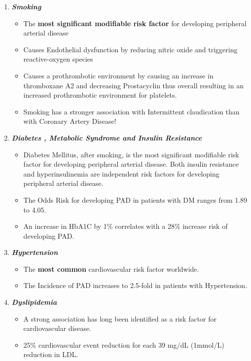 \documentclass[
]{book}
\begin{document}
\begin{enumerate}
\def\labelenumi{\arabic{enumi}.}
\item
  \textbf{\emph{Smoking}}

  \begin{itemize}
  \item
    The \textbf{most significant modifiable risk factor} for developing
    peripheral arterial disease
  \item
    Causes Endothelial dysfunction by reducing nitric oxide and
    triggering reactive-oxygen species
    \citep{unitedstatessurgeongeneralHealthConsequencesSmoking2014}
  \item
    Causes a prothrombotic environment by causing an increase in
    thromboxane A2 and decreasing Prostacyclin thus overall
    resulting in an increased prothrombotic environment for
    platelets.
  \item
    Smoking has a stronger association with Intermittent
    claudication than with Coronary Artery Disease!
    \citep{gordonPredispositionAtherosclerosisHead1972}
  \end{itemize}
\item
  \textbf{\emph{Diabetes , Metabolic Syndrome and Insulin Resistance}}

  \begin{itemize}
  \item
    Diabetes Mellitus, after smoking, is the most significant
    modifiable risk factor for developing peripheral arterial
    disease. Both insulin resistance and hyperinsulinemia are
    independent risk factors for developing peripheral arterial
    disease.
  \item
    The Odds Risk for developing PAD in patients with DM ranges from
    1.89 to 4.05.
  \item
    An increase in HbA1C by 1\% correlates with a 28\% increase risk
    of developing PAD. \citep{adlerUKPDS59Hyperglycemia2002}
  \end{itemize}
\item
  \textbf{\emph{Hypertension}}

  \begin{itemize}
  \item
    The \textbf{most common} cardiovascular risk factor worldwide.
  \item
    The Incidence of PAD increases to 2.5-fold in patients with
    Hypertension. \citep{kannelUpdateEpidemiologicFeatures1985}
  \end{itemize}
\item
  \textbf{\emph{Dyslipidemia}}

  \begin{itemize}
  \item
    A strong association has long been identified as a risk factor
    for cardiovascular disease.
  \item
    25\% cardiovascular event reduction for each 39 mg/dL (1mmol/L)
    reduction in LDL.
    \citep{heartprotectionstudycollaborativegroupRandomizedTrialEffects2007}
  \end{itemize}
\end{enumerate}
\end{document}

